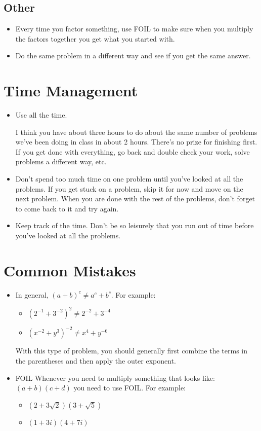 \documentclass{article}
\begin{document}
\subsection{Other}
\begin{itemize}
  \item Every time you factor something, use FOIL to make sure when you multiply the factors together you get what you
    started with.
  \item Do the same problem in a different way and see if you get the same answer.
\end{itemize}

\section{Time Management}
\begin{itemize}
\item
Use all the time.  

I think you have about three hours to do about the same number of problems we've been doing in class
in about 2 hours.  There's no prize for finishing first.  If you get done with everything, go back and double check
your work, solve problems a different way, etc.  

\item
Don't spend too much time on one problem until you've looked at all the problems.  If you get stuck on a problem, skip
it for now and move on the next problem.  When you are done with the rest of the problems, don't forget to come
back to it and try again.

\item
Keep track of the time.  Don't be so leisurely that you run out of time before you've looked at all the problems.

\end{itemize}

\section{Common Mistakes}

\begin{itemize}
  \item In general, $(a+b)^c \ne a^c + b^c$.  For example:
    \begin{itemize}
      \item $(2^{-1} + 3^{-2})^2 \ne 2^{-2} + 3^{-4}$
      \item $(x^{-2} + y^{3})^{-2} \ne x^4 + y^{-6}$
    \end{itemize}
With this type of problem, you should generally first combine the terms in the parentheses and then apply the outer
exponent.

\item FOIL
  Whenever you need to multiply something that looks like: $(a+b)(c+d)$ you need to use FOIL.  For example:
  \begin{itemize}
    \item $(2 + 3\sqrt{2})(3 + \sqrt{5})$
    \item $(1 + 3i)(4 + 7i)$
  \end{itemize}

\end{itemize}
\end{document}
